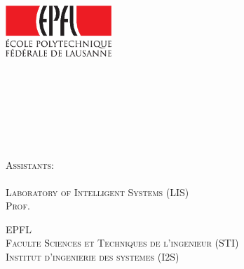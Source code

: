 \begin{titlepage}

\begin{center}

\includegraphics[width=4cm]{logo_epfl_coul.eps}

\vspace*{5cm}
\Large
\textsc{\Ptitle}\\
\vspace{0.5cm}
\normalsize
\textsc{\Ptype }\\ %
\vspace{1.5cm}

\large
\textsc{\Pcand\\[0.5\baselineskip] }
\normalsize
\textsc{\Psect}\\
\vspace{1cm}

\textsc{\Pseason}\\ %
\vspace{2cm}
\textsc{Assistants:\\ \Pfirst}\\
\vspace{1cm}
\textsc{Laboratory of Intelligent Systems (LIS)\\
Prof. \Pprof\\}


\vspace{1.5cm}
\textsc{EPFL\\
Faculte Sciences et Techniques de l'ingenieur (STI)\\
Institut d'ingenierie des systemes (I2S) }\\

\end{center}

\end{titlepage}

